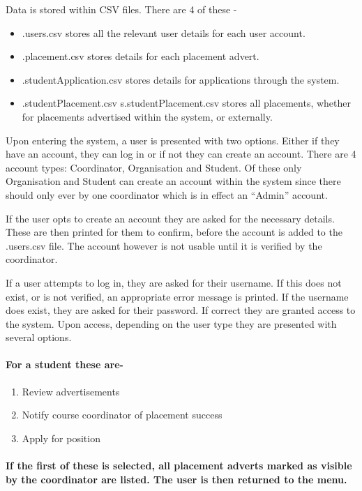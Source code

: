 \documentclass{l3deliverable}
\begin{document}
\begin{flushleft}
Data is stored within CSV files. There are 4 of these - 
\par\end{flushleft}
\begin{itemize}
\item .users.csv stores all the relevant user details for each user account.
\item .placement.csv stores details for each placement advert.
\item .studentApplication.csv stores details for applications through the
system.
\item .studentPlacement.csv s.studentPlacement.csv stores all placements,
whether for placements advertised within the system, or externally.
\end{itemize}
Upon entering the system, a user is presented with two options. Either
if they have an account, they can log in or if not they can create
an account. There are 4 account types: Coordinator, Organisation
and Student. Of these only Organisation and Student can create an
account within the system since there should only ever by one coordinator
which is in effect an \textquotedblleft{}Admin\textquotedblright{}
account.

If the user opts to create an account they are asked for the necessary
details. These are then printed for them to confirm, before the account
is added to the .users.csv file. The account however is not usable
until it is verified by the coordinator.

If a user attempts to log in, they are asked for their username. If
this does not exist, or is not verified, an appropriate error message
is printed. If the username does exist, they are asked for their password.
If correct they are granted access to the system. Upon access, depending
on the user type they are presented with several options.


\paragraph{\textmd{For a student these are-}}
\begin{enumerate}
\item Review advertisements
\item Notify course coordinator of placement success 
\item Apply for position
\end{enumerate}

\paragraph*{\textmd{If the first of these is selected, all placement adverts
marked as visible by the coordinator are listed. The user is then
returned to the menu.}}
\end{document}
